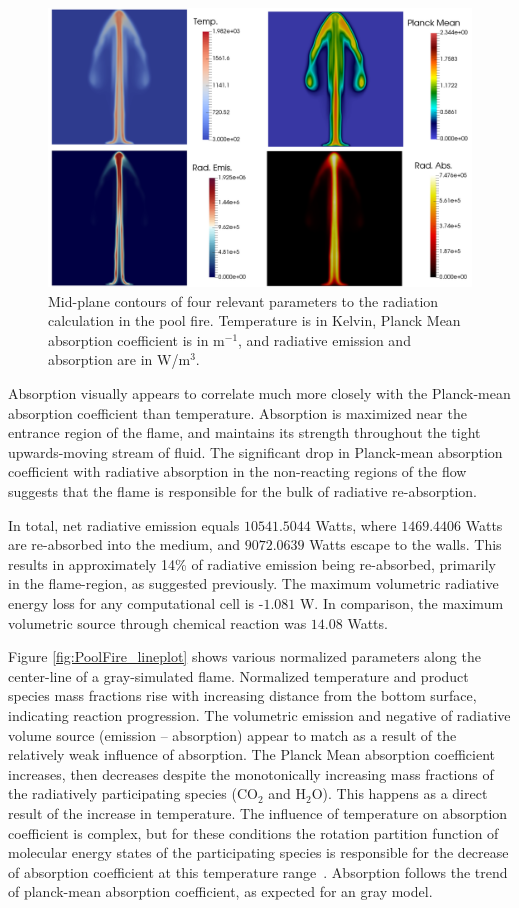\begin{figure}
\centering
\includegraphics[width=0.85\linewidth]{figures/ch4/PoolFire_quadcomparison.png}
\caption{Mid-plane contours of four relevant parameters to the radiation calculation in the pool fire. Temperature is in Kelvin, Planck Mean absorption coefficient is in m$^{-1}$, and radiative emission and absorption are in W/m$^3$.}
\label{fig:PoolFire_quadcomparison}
\end{figure}

Absorption visually appears to correlate much more closely with the Planck-mean absorption coefficient than temperature. Absorption is maximized near the entrance region of the flame, and maintains its strength throughout the tight upwards-moving stream of fluid.
The significant drop in Planck-mean absorption coefficient with radiative absorption in the non-reacting regions of the flow suggests that the flame is responsible for the bulk of radiative re-absorption. 

In total, net radiative emission equals $10541.5044$ Watts, where $1469.4406$ Watts are re-absorbed into the medium, and $9072.0639$ Watts escape to the walls. This results in approximately 14\% of radiative emission being re-absorbed, primarily in the flame-region, as suggested previously. 
The maximum volumetric radiative energy loss for any computational cell is -$1.081$ W. In comparison, the maximum volumetric source through chemical reaction was $14.08$ Watts.

Figure \ref{fig:PoolFire_lineplot} shows various normalized parameters along the center-line of a gray-simulated flame. 
Normalized temperature and product species mass fractions rise with increasing distance from the bottom surface, indicating reaction progression. 
The volumetric emission and negative of radiative volume source (emission – absorption) appear to match as a result of the relatively weak influence of absorption.
The Planck Mean absorption coefficient increases, then decreases despite the monotonically increasing mass fractions of the radiatively participating species (CO$_2$ and H$_2$O). This happens as a direct result of the increase in temperature. 
The influence of temperature on absorption coefficient is complex, but for these conditions the rotation partition function of molecular energy states of the participating species is responsible for the decrease of absorption coefficient at this temperature range~\cite{Modest2013RadiativeTransfer}.
Absorption follows the trend of planck-mean absorption coefficient, as expected for an gray model.

